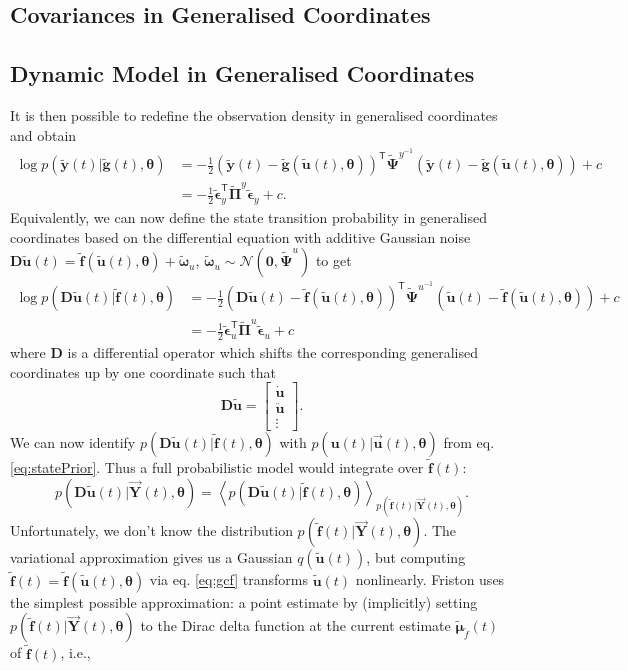 \documentclass[a4paper,10pt]{article}
\newcommand{\bs}[1]{\mathbf{#1}}					%
\newcommand{\bgs}[1]{\boldsymbol{#1}}				%
\newcommand{\tr}{\mathsf{T}}				%
\newcommand{\eq}[1]{\begin{equation} #1 \end{equation}}%
\newcommand{\gc}[1]{\tilde{#1}} %
\renewcommand{\ss}{u}         %
\newcommand{\so}{y}         %
\newcommand{\spe}{\epsilon} %
\renewcommand{\sp}{\theta}    %
\newcommand{\ps}{\bs{\ss}}    %
\newcommand{\po}{\bs{\so}}    %
\newcommand{\ppe}{\bgs{\spe}} %
\newcommand{\psg}{\gc{\ps}}    %
\newcommand{\pog}{\gc{\po}}    %
\newcommand{\ppeg}{\gc{\ppe}} %
\newcommand{\pp}{\bgs{\sp}} %
\newcommand{\Po}{\bs{Y}}    %
\newcommand{\D}{\bs{D}}				%
\newcommand{\E}[2][]{\left\langle #2 \right\rangle_{#1}}	%
\newcommand{\N}{\mathcal{N}}			%
\begin{document}
\subsection{Covariances in Generalised Coordinates}


\subsection{Dynamic Model in Generalised Coordinates}
It is then possible to redefine the observation density in generalised coordinates and obtain
\begin{align}
    \log p(\pog(t)|\gc{\bs{g}}(t),\pp) &= -\frac{1}{2}(\pog(t) - \gc{\bs{g}}(\psg(t),\pp))^\tr\gc{\bgs{\Psi}}^{\so^{-1}}(\pog(t) - \gc{\bs{g}}(\psg(t),\pp)) + c\\
    &= -\frac{1}{2}\ppeg_\so^\tr\gc{\bgs{\Pi}}^{\so}\ppeg_\so + c.
\end{align}
Equivalently, we can now define the state transition probability in generalised coordinates based on the differential equation with additive Gaussian noise $\D\psg(t) = \gc{\bs{f}}(\psg(t),\pp)+\gc{\bgs{\omega}}_\ss$, $\gc{\bgs{\omega}}_\ss\sim \N(\bs{0},\gc{\bgs{\Psi}}^\ss)$ to get
\begin{align}
    \log p(\D\psg(t)|\gc{\bs{f}}(t),\pp) &= -\frac{1}{2}(\D\psg(t) - \gc{\bs{f}}(\psg(t),\pp))^\tr\gc{\bgs{\Psi}}^{\ss^{-1}}(\psg(t) - \gc{\bs{f}}(\psg(t),\pp)) + c\\
    &= -\frac{1}{2}\ppeg_\ss^\tr\gc{\bgs{\Pi}}^{\ss}\ppeg_\ss + c
\end{align}
where $\D$ is a differential operator which shifts the corresponding generalised coordinates up by one coordinate such that
\eq{\label{eq:derivativeOperator}
    \D\psg = \left[\begin{array}{c} \dot{\ps}\\ \ddot{\ps}\\ \vdots \end{array}\right].
}
We can now identify $p(\D\psg(t)|\gc{\bs{f}}(t),\pp)$ with $p(\ps(t)|\vec{\ps}(t),\pp)$ from eq. \eqref{eq:statePrior}. Thus a full probabilistic model would integrate over $\gc{\bs{f}}(t)$:
\eq{
    p(\D\psg(t)|\vec{\Po}(t),\pp) = \E[p(\gc{\bs{f}}(t)|\vec{\Po}(t),\pp)]{p(\D\psg(t)|\gc{\bs{f}}(t),\pp)}.
}
Unfortunately, we don't know the distribution $p(\gc{\bs{f}}(t)|\vec{\Po}(t),\pp)$. The variational approximation gives us a Gaussian $q(\psg(t))$, but computing $\gc{\bs{f}}(t) = \gc{\bs{f}}(\psg(t),\pp)$ via eq. \eqref{eq:gcf} transforms $\psg(t)$ nonlinearly. Friston uses the simplest possible approximation: a point estimate by (implicitly) setting $p(\gc{\bs{f}}(t)|\vec{\Po}(t),\pp)$ to the Dirac delta function at the current estimate $\gc{\bgs{\mu}}_{\gc{f}}(t)$ of $\gc{\bs{f}}(t)$, i.e.,
\end{document}
